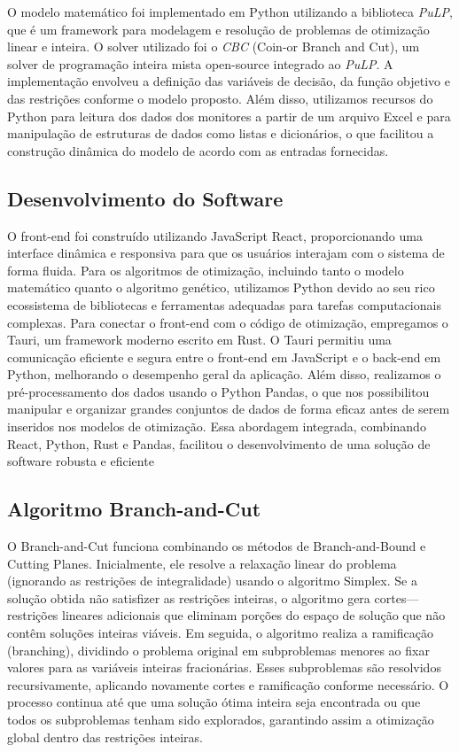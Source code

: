\documentclass[a4paper,12pt]{article}
\begin{document}
O modelo matemático foi implementado em Python utilizando a biblioteca \textit{PuLP}, que é um framework para modelagem e resolução de problemas de otimização linear e inteira. O solver utilizado foi o \textit{CBC} (Coin-or Branch and Cut), um solver de programação inteira mista open-source integrado ao \textit{PuLP}. A implementação envolveu a definição das variáveis de decisão, da função objetivo e das restrições conforme o modelo proposto. Além disso, utilizamos recursos do Python para leitura dos dados dos monitores a partir de um arquivo Excel e para manipulação de estruturas de dados como listas e dicionários, o que facilitou a construção dinâmica do modelo de acordo com as entradas fornecidas.


\subsection{Desenvolvimento do Software}

O front-end foi construído utilizando JavaScript React, proporcionando uma interface dinâmica e responsiva para que os usuários interajam com o sistema de forma fluida. Para os algoritmos de otimização, incluindo tanto o modelo matemático quanto o algoritmo genético, utilizamos Python devido ao seu rico ecossistema de bibliotecas e ferramentas adequadas para tarefas computacionais complexas. Para conectar o front-end com o código de otimização, empregamos o Tauri, um framework moderno escrito em Rust. O Tauri permitiu uma comunicação eficiente e segura entre o front-end em JavaScript e o back-end em Python, melhorando o desempenho geral da aplicação. Além disso, realizamos o pré-processamento dos dados usando o Python Pandas, o que nos possibilitou manipular e organizar grandes conjuntos de dados de forma eficaz antes de serem inseridos nos modelos de otimização. Essa abordagem integrada, combinando React, Python, Rust e Pandas, facilitou o desenvolvimento de uma solução de software robusta e eficiente

\subsection{Algoritmo Branch-and-Cut}

O Branch-and-Cut funciona combinando os métodos de Branch-and-Bound e Cutting Planes. Inicialmente, ele resolve a relaxação linear do problema (ignorando as restrições de integralidade) usando o algoritmo Simplex. Se a solução obtida não satisfizer as restrições inteiras, o algoritmo gera cortes—restrições lineares adicionais que eliminam porções do espaço de solução que não contêm soluções inteiras viáveis. Em seguida, o algoritmo realiza a ramificação (branching), dividindo o problema original em subproblemas menores ao fixar valores para as variáveis inteiras fracionárias. Esses subproblemas são resolvidos recursivamente, aplicando novamente cortes e ramificação conforme necessário. O processo continua até que uma solução ótima inteira seja encontrada ou que todos os subproblemas tenham sido explorados, garantindo assim a otimização global dentro das restrições inteiras.
\end{document}

